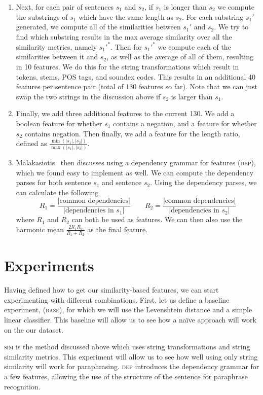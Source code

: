 \documentclass[11pt, reqno]{amsart}
\newcommand{\mala}{Malakasiotis}
\begin{document}
\begin{enumerate}
	\item Next, for each pair of sentences $s_1$ and $s_2$, if $s_1$ is longer than $s_2$ we compute the substrings of $s_1$ which have the same length as $s_2$. For each substring $s_1'$ generated, we compute all of the similarities between $s_1'$ and $s_2$. We try to find which substring results in the max average similarity over all the similarity metrics, namely $s_1'^*$. Then for $s_1'^*$ we compute each of the similarities between it and $s_2$, as well as the average of all of them, resulting in 10 features. We do this for the string transformations which result in tokens, stems, POS tags, and soundex codes. This results in an additional 40 features per sentence pair (total of 130 features so far). Note that we can just swap the two strings in the discussion above if $s_2$ is larger than $s_1$. 
	
	\item Finally, we add three additional features to the current 130. We add a boolean feature for whether $s_1$ contains a negation, and a feature for whether $s_2$ contains negation. Then finally, we add a feature for the length ratio, defined as $\frac{\min(|s_1|, |s_2|)}{\max(|s_1|, |s_2|)}$.
	
	\item \mala~ then discusses using a dependency grammar for features (\textsc{dep}), which we found easy to implement as well. We can compute the dependency parses for both sentence $s_1$ and sentence $s_2$. Using the dependency parses, we can calculate the following
	$$R_1 = \frac{|\text{common dependencies}|}{|\text{dependencies in }s_1|} \qquad R_2 = \frac{|\text{common dependencies}|}{|\text{dependencies in }s_2|}$$
	where $R_1$ and $R_2$ can both be used as features. We can then also use the harmonic mean $\frac{2R_1R_2}{R_1 + R_2}$ as the final feature. 
	\end{enumerate}
	
	\section{Experiments}
	
	Having defined how to get our similarity-based features, we can start experimenting with different combinations. First, let us define a baseline experiment, (\textsc{base}), for which we will use the Levenshtein distance and a simple linear classifier. This baseline will allow us to see how a na\"ive approach will work on the our dataset. 
	
	\textsc{sim} is the method discussed above which uses string transformations and string similarity metrics. This experiment will allow us to see how well using only string similarity will work for paraphrasing. \textsc{dep} introduces the dependency grammar for a few features, allowing the use of the structure of the sentence for paraphrase recognition. 
	
\end{document}
